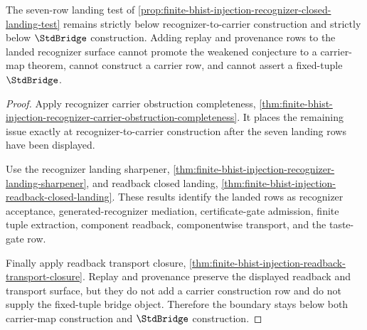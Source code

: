 \begin{theorem}
\label{thm:finite-bhist-injection-carrier-map-boundary}
The seven-row landing test of \autoref{prop:finite-bhist-injection-recognizer-closed-landing-test} remains strictly below recognizer-to-carrier construction and strictly below $\StdBridge$ construction. Adding replay and provenance rows to the landed recognizer surface cannot promote the weakened conjecture to a carrier-map theorem, cannot construct a carrier row, and cannot assert a fixed-tuple $\StdBridge$.
\end{theorem}
\begin{proof}
Apply recognizer carrier obstruction completeness, \autoref{thm:finite-bhist-injection-recognizer-carrier-obstruction-completeness}. It places the remaining issue exactly at recognizer-to-carrier construction after the seven landing rows have been displayed.

Use the recognizer landing sharpener, \autoref{thm:finite-bhist-injection-recognizer-landing-sharpener}, and readback closed landing, \autoref{thm:finite-bhist-injection-readback-closed-landing}. These results identify the landed rows as recognizer acceptance, generated-recognizer mediation, certificate-gate admission, finite tuple extraction, component readback, componentwise transport, and the taste-gate row.

Finally apply readback transport closure, \autoref{thm:finite-bhist-injection-readback-transport-closure}. Replay and provenance preserve the displayed readback and transport surface, but they do not add a carrier construction row and do not supply the fixed-tuple bridge object. Therefore the boundary stays below both carrier-map construction and $\StdBridge$ construction.
\end{proof}

